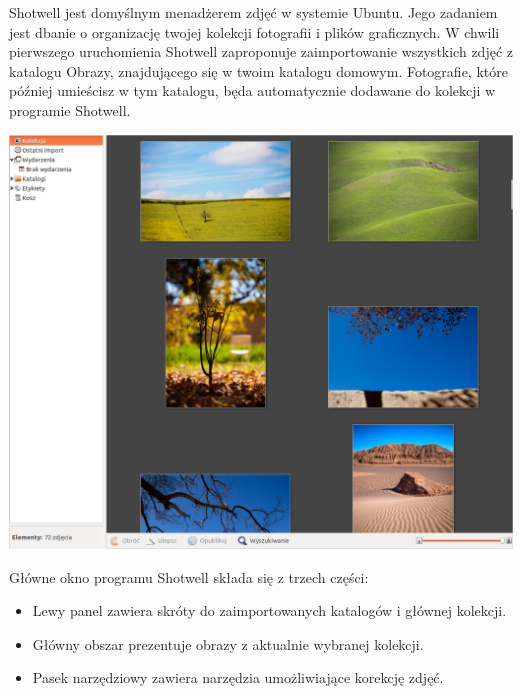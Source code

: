 Shotwell jest domyślnym menadżerem zdjęć w systemie Ubuntu. Jego zadaniem jest dbanie o organizację twojej kolekcji fotografii i plików graficznych. W chwili pierwszego uruchomienia Shotwell zaproponuje zaimportowanie wszystkich zdjęć z katalogu Obrazy, znajdującego się w twoim katalogu domowym. Fotografie, które później umieścisz w tym katalogu, będa automatycznie dodawane do kolekcji w programie Shotwell.
\begin{center}
	\includegraphics[width=\linewidth]{images/programy_shotwell1.png}
\end{center}

Główne okno programu Shotwell składa się z trzech części:
\begin{itemize}
\item \textcolor{ubuntu_orange}{Lewy panel} zawiera skróty do zaimportowanych katalogów i głównej kolekcji.
\item \textcolor{ubuntu_orange}{Główny obszar} prezentuje obrazy z aktualnie wybranej kolekcji.
\item \textcolor{ubuntu_orange}{Pasek narzędziowy} zawiera narzędzia umożliwiające korekcję zdjęć.
\end{itemize}
